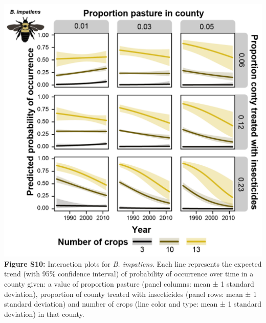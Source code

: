 \documentclass[11pt,]{article}
\begin{document}
\includegraphics[width=1\textwidth,height=\textheight]{../ms_figs/fig_s10.png}
\textbf{Figure S10:} Interaction plots for \emph{B. impatiens}. Each
line represents the expected trend (with 95\% confidence interval) of
probability of occurrence over time in a county given: a value of
proportion pasture (panel columns: mean ± 1 standard deviation),
proportion of county treated with insecticides (panel rows: mean ± 1
standard deviation) and number of crops (line color and type: mean ± 1
standard deviation) in that county. \clearpage

\newpage
\end{document}
